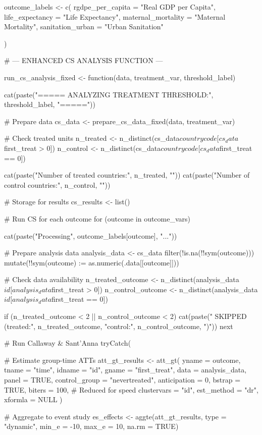 {{{outcome_labels <- c(
  rgdpe_per_capita = "Real GDP per Capita",
  life_expectancy = "Life Expectancy",
  maternal_mortality = "Maternal Mortality",
  sanitation_urban = "Urban Sanitation"

)

# --- ENHANCED CS ANALYSIS FUNCTION ---

run_cs_analysis_fixed <- function(data, treatment_var, threshold_label) {
  
  cat(paste("\n===== ANALYZING TREATMENT THRESHOLD:", threshold_label, "=====\n"))
  
  # Prepare data
  cs_data <- prepare_cs_data_fixed(data, treatment_var)
  
  # Check treated units
  n_treated <- n_distinct(cs_data$countrycode[cs_data$first_treat > 0])
  n_control <- n_distinct(cs_data$countrycode[cs_data$first_treat == 0])
  
  cat(paste("Number of treated countries:", n_treated, "\n"))
  cat(paste("Number of control countries:", n_control, "\n\n"))
  
  # Storage for results
  cs_results <- list()
  
  # Run CS for each outcome
  for (outcome in outcome_vars) {
    cat(paste("Processing", outcome_labels[outcome], "..."))
    
    # Prepare analysis data
    analysis_data <- cs_data %
      filter(!is.na(!!sym(outcome))) %
      mutate(!!sym(outcome) := as.numeric(.data[[outcome]]))
    
    # Check data availability
    n_treated_outcome <- n_distinct(analysis_data$id[analysis_data$first_treat > 0])
    n_control_outcome <- n_distinct(analysis_data$id[analysis_data$first_treat == 0])
    
    if (n_treated_outcome < 2 || n_control_outcome < 2) {
      cat(paste(" SKIPPED (treated:", n_treated_outcome, "control:", n_control_outcome, ")\n"))
      next
    }
    
    # Run Callaway & Sant'Anna
    tryCatch({
      # Estimate group-time ATTs
      att_gt_results <- att_gt(
        yname = outcome,
        tname = "time",
        idname = "id",
        gname = "first_treat",
        data = analysis_data,
        panel = TRUE,
        control_group = "nevertreated",
        anticipation = 0,
        bstrap = TRUE,
        biters = 100,  # Reduced for speed
        clustervars = "id",
        est_method = "dr",
        xformla = NULL
      )
      
      # Aggregate to event study
      es_effects <- aggte(att_gt_results, type = "dynamic", 
                         min_e = -10, max_e = 10, na.rm = TRUE)
      
}}}}}}
